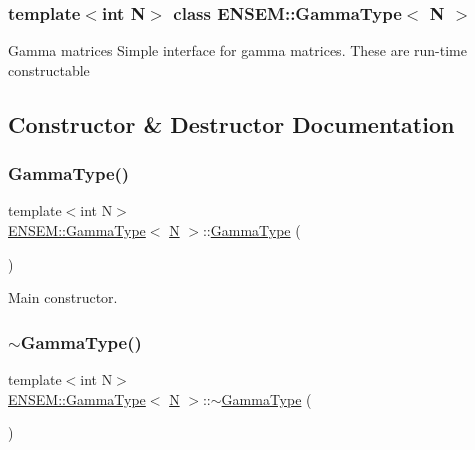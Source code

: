 \subsubsection*{template$<$int N$>$\newline
class E\+N\+S\+E\+M\+::\+Gamma\+Type$<$ N $>$}

Gamma matrices Simple interface for gamma matrices. These are run-\/time constructable 

\subsection{Constructor \& Destructor Documentation}
\mbox{\label{classENSEM_1_1GammaType_a40badc5d1ed98704d66277e171adb121}} 
\subsubsection{\texorpdfstring{GammaType()}{GammaType()}\hspace{0.1cm}{\footnotesize\ttfamily [1/6]}}
{\footnotesize\ttfamily template$<$int N$>$ \\
\mbox{\hyperlink{classENSEM_1_1GammaType}{E\+N\+S\+E\+M\+::\+Gamma\+Type}}$<$ \mbox{\hyperlink{adat__devel_2lib_2hadron_2operator__name__util_8cc_a7722c8ecbb62d99aee7ce68b1752f337}{N}} $>$\+::\mbox{\hyperlink{classENSEM_1_1GammaType}{Gamma\+Type}} (\begin{DoxyParamCaption}{ }\end{DoxyParamCaption})\hspace{0.3cm}{\ttfamily [inline]}}



Main constructor. 

\mbox{\label{classENSEM_1_1GammaType_a2cc80e9a9f044b1b9b344f3419718a5e}} 
\subsubsection{\texorpdfstring{$\sim$GammaType()}{~GammaType()}\hspace{0.1cm}{\footnotesize\ttfamily [1/3]}}
{\footnotesize\ttfamily template$<$int N$>$ \\
\mbox{\hyperlink{classENSEM_1_1GammaType}{E\+N\+S\+E\+M\+::\+Gamma\+Type}}$<$ \mbox{\hyperlink{adat__devel_2lib_2hadron_2operator__name__util_8cc_a7722c8ecbb62d99aee7ce68b1752f337}{N}} $>$\+::$\sim$\mbox{\hyperlink{classENSEM_1_1GammaType}{Gamma\+Type}} (\begin{DoxyParamCaption}{ }\end{DoxyParamCaption})\hspace{0.3cm}{\ttfamily [inline]}}



